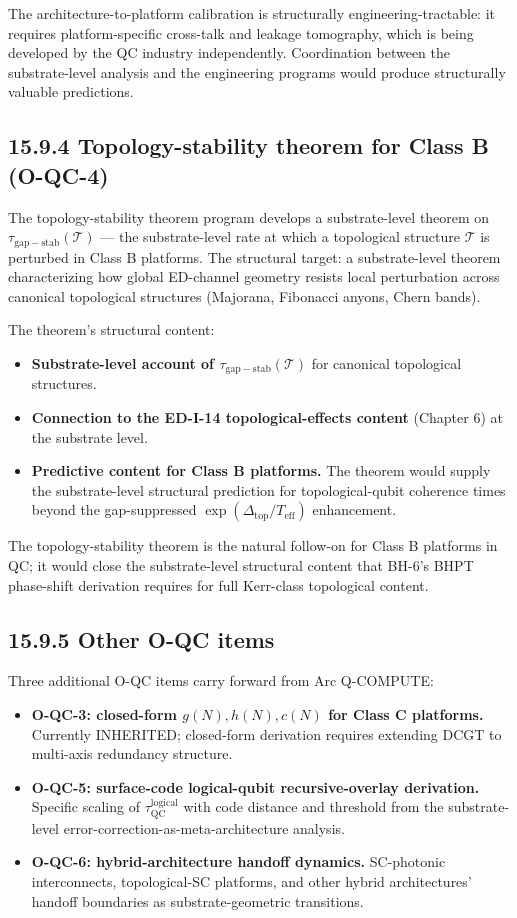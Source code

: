 \documentclass[11pt]{book}
\begin{document}
The architecture-to-platform calibration is structurally engineering-tractable: it requires platform-specific cross-talk and leakage tomography, which is being developed by the QC industry independently. Coordination between the substrate-level analysis and the engineering programs would produce structurally valuable predictions.

\subsection{15.9.4 Topology-stability theorem for Class B (O-QC-4)}

The topology-stability theorem program develops a substrate-level theorem on $\tau_\mathrm{gap-stab}(\mathcal{T})$ — the substrate-level rate at which a topological structure $\mathcal{T}$ is perturbed in Class B platforms. The structural target: a substrate-level theorem characterizing how global ED-channel geometry resists local perturbation across canonical topological structures (Majorana, Fibonacci anyons, Chern bands).

The theorem's structural content:
\begin{itemize}
\item \textbf{Substrate-level account of $\tau_\mathrm{gap-stab}(\mathcal{T})$} for canonical topological structures.
\item \textbf{Connection to the ED-I-14 topological-effects content} (Chapter 6) at the substrate level.
\item \textbf{Predictive content for Class B platforms.} The theorem would supply the substrate-level structural prediction for topological-qubit coherence times beyond the gap-suppressed $\exp(\Delta_\mathrm{top}/T_\mathrm{eff})$ enhancement.
\end{itemize}

The topology-stability theorem is the natural follow-on for Class B platforms in QC; it would close the substrate-level structural content that BH-6's BHPT phase-shift derivation requires for full Kerr-class topological content.

\subsection{15.9.5 Other O-QC items}

Three additional O-QC items carry forward from Arc Q-COMPUTE:

\begin{itemize}
\item \textbf{O-QC-3: closed-form $g(N), h(N), c(N)$ for Class C platforms.} Currently INHERITED; closed-form derivation requires extending DCGT to multi-axis redundancy structure.
\item \textbf{O-QC-5: surface-code logical-qubit recursive-overlay derivation.} Specific scaling of $\tau_\mathrm{QC}^\mathrm{logical}$ with code distance and threshold from the substrate-level error-correction-as-meta-architecture analysis.
\item \textbf{O-QC-6: hybrid-architecture handoff dynamics.} SC-photonic interconnects, topological-SC platforms, and other hybrid architectures' handoff boundaries as substrate-geometric transitions.
\end{itemize}
\end{document}
